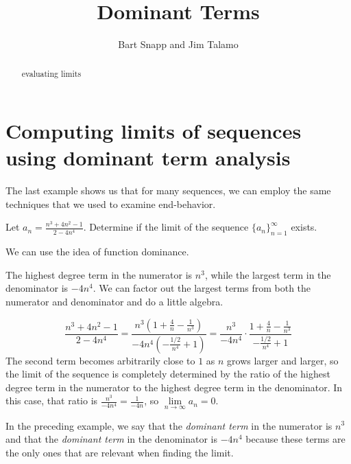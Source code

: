 \documentclass{ximera}
\author{Bart Snapp and Jim Talamo}
\title{Dominant Terms}
\begin{document}
\begin{abstract}
evaluating limits
\end{abstract}
\maketitle






\section*{Computing limits of sequences using dominant term analysis}
The last example shows us that for many sequences, we can employ the same techniques that we used to examine end-behavior.  

\begin{example}
Let $a_n = \frac{n^3+4n^2-1}{2-4n^4}$.  Determine if the limit of the sequence $\{a_n\}_{n=1}^{\infty}$ exists.

\begin{explanation}
We can use the idea of function dominance. 

The highest degree term in the numerator is $n^3$, while the largest term in the denominator is $-4n^4$.  We can factor out the largest terms from both the numerator and denominator and do a little algebra.

\[
\frac{n^3+4n^2-1}{2-4n^4} = \frac{n^3\left(1+\frac{4}{n}-\frac{1}{n^3}\right)}{-4n^4\left(-\frac{1/2}{n^4}+1\right)} = \frac{n^3}{-4n^4} \cdot  \frac{1+\frac{4}{n}-\frac{1}{n^3}}{-\frac{1/2}{n^4}+1}
\]
The second term becomes arbitrarily close to $1$ as $n$ grows larger and larger, so the limit of the sequence is completely determined by the ratio of the highest degree term in the numerator to the highest degree term in the denominator.  In this case, that ratio is $\frac{n^3}{-4n^4} = \frac{1}{-4n}$, so $\lim\limits_{n \to \infty} a_n = 0$.

\end{explanation}
\end{example}










In the preceding example, we say that the \emph{dominant term} in the numerator is $n^3$ and that the \emph{dominant term} in the denominator is $-4n^4$ because these terms are the only ones that are relevant when finding the limit.
\end{document}
